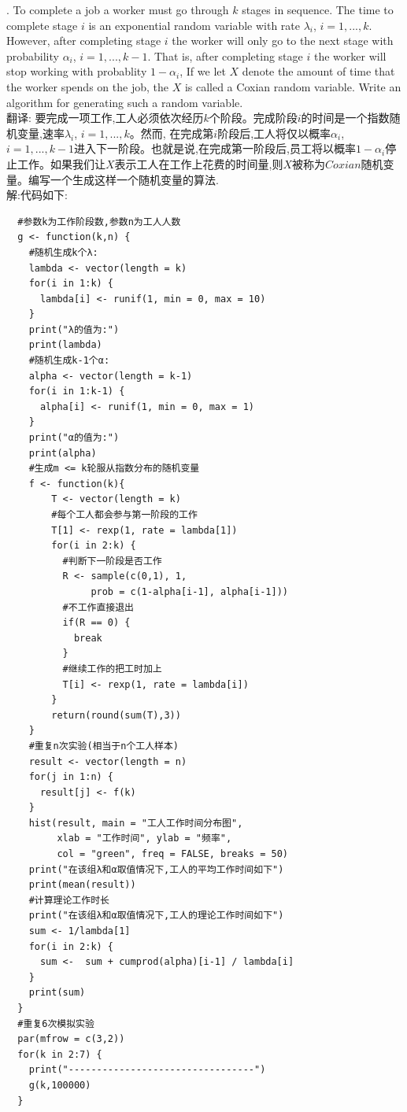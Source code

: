 \documentclass{book}
\begin{document}
. To complete a job a worker must go through $k$ stages in sequence. The time to complete stage $i$ is an
exponential random variable with rate $\lambda_{i}$, $i = 1,...,k$. However, after
completing stage $i$ the worker will only go to the next stage with probability $\alpha_{i}$, $i = 1,...,k-1$.
That is, after completing stage $i$ the worker will stop working with probablity $1-\alpha_{i}$, If we let $X$
denote the amount of time that the worker spends on the job, the $X$ is called a Coxian random variable.
Write an algorithm for generating such a random variable. \\
翻译:
要完成一项工作,工人必须依次经历$k$个阶段。完成阶段$i$的时间是一个指数随机变量,速率$\lambda_{i}$, $i = 1,...,k$。然而,
在完成第$i$阶段后,工人将仅以概率$\alpha_{i}$, $i = 1,...,k-1$进入下一阶段。也就是说,在完成第一阶段后,员工将以概率$1-\alpha
  _{i}$停止工作。如果我们让$X$表示工人在工作上花费的时间量,则$X$被称为$Coxian$随机变量。编写一个生成这样一个随机变量的算法. \\
解:代码如下:
\lstset{language = R}
\begin{lstlisting}
  #参数k为工作阶段数,参数n为工人人数
  g <- function(k,n) {  
    #随机生成k个λ:
    lambda <- vector(length = k)
    for(i in 1:k) {
      lambda[i] <- runif(1, min = 0, max = 10)
    }
    print("λ的值为:")
    print(lambda)
    #随机生成k-1个α:
    alpha <- vector(length = k-1)
    for(i in 1:k-1) {
      alpha[i] <- runif(1, min = 0, max = 1) 
    }
    print("α的值为:")
    print(alpha)
    #生成m <= k轮服从指数分布的随机变量
    f <- function(k){
        T <- vector(length = k)
        #每个工人都会参与第一阶段的工作
        T[1] <- rexp(1, rate = lambda[1])
        for(i in 2:k) {
          #判断下一阶段是否工作
          R <- sample(c(0,1), 1, 
               prob = c(1-alpha[i-1], alpha[i-1]))
          #不工作直接退出
          if(R == 0) {
            break
          } 
          #继续工作的把工时加上
          T[i] <- rexp(1, rate = lambda[i])
        }
        return(round(sum(T),3))
    }
    #重复n次实验(相当于n个工人样本)
    result <- vector(length = n)
    for(j in 1:n) {
      result[j] <- f(k)
    }
    hist(result, main = "工人工作时间分布图",
         xlab = "工作时间", ylab = "频率",
         col = "green", freq = FALSE, breaks = 50)
    print("在该组λ和α取值情况下,工人的平均工作时间如下")
    print(mean(result))
    #计算理论工作时长
    print("在该组λ和α取值情况下,工人的理论工作时间如下")
    sum <- 1/lambda[1]
    for(i in 2:k) {
      sum <-  sum + cumprod(alpha)[i-1] / lambda[i]
    }
    print(sum)
  }
  #重复6次模拟实验
  par(mfrow = c(3,2))
  for(k in 2:7) {
    print("---------------------------------")
    g(k,100000)
  }
\end{lstlisting}
\end{document}
